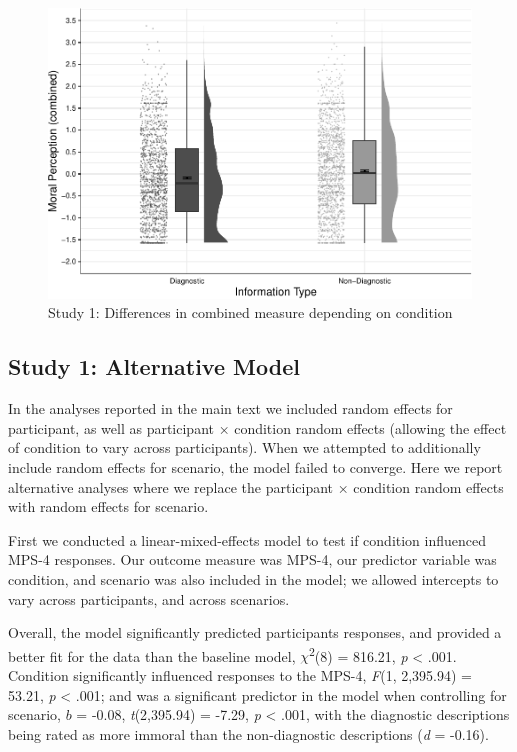 \documentclass[
  man,floatsintext]{apa6}
\begin{document}
\begin{figure}[!h]
\includegraphics[width=\textwidth,]{Supplementary_files/figure-latex/S1combinedconditionplot-1} \caption{Study 1: Differences in combined measure depending on condition}\label{fig:S1combinedconditionplot}
\end{figure}

\newpage

\subsection{Study 1: Alternative Model}\label{study-1-alternative-model}

In the analyses reported in the main text we included random effects for participant, as well as participant × condition random effects (allowing the effect of condition to vary across participants). When we attempted to additionally include random effects for scenario, the model failed to converge. Here we report alternative analyses where we replace the participant × condition random effects with random effects for scenario.

First we conducted a linear-mixed-effects model to test if condition influenced MPS-4 responses. Our outcome measure was MPS-4, our predictor variable was condition, and scenario was also included in the model; we allowed intercepts to vary across participants, and across scenarios.

Overall, the model significantly predicted participants responses, and provided a better fit for the data than the baseline model, \(\chi\)\textsuperscript{2}(8) = 816.21, \emph{p} \textless{} .001. Condition significantly influenced responses to the MPS-4, \emph{F}(1, 2,395.94) = 53.21, \emph{p} \textless{} .001; and was a significant predictor in the model when controlling for scenario, \(b\) = -0.08, \emph{t}(2,395.94) = -7.29, \emph{p} \textless{} .001, with the diagnostic descriptions being rated as more immoral than the non-diagnostic descriptions (\emph{d} = -0.16).
\end{document}
